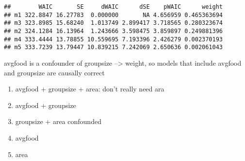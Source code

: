 \documentclass[
]{article}
\begin{document}
\begin{verbatim}
##        WAIC       SE     dWAIC      dSE    pWAIC      weight
## m1 322.8847 16.27783  0.000000       NA 4.656959 0.465363694
## m3 323.8985 15.68240  1.013749 2.899417 3.718565 0.280323674
## m2 324.1284 16.13964  1.243666 3.598475 3.859897 0.249881396
## m4 333.4444 13.78855 10.559695 7.193396 2.426279 0.002370193
## m5 333.7239 13.79447 10.839215 7.242069 2.650636 0.002061043
\end{verbatim}

avgfood is a confounder of groupsize --\textgreater{} weight, so models
that include avgfood and groupsize are causally correct

\begin{enumerate}
\def\labelenumi{(\arabic{enumi})}
\item
  avgfood + groupsize + area: don't really need ara
\item
  avgfood + groupsize
\item
  groupsize + area confounded
\item
  avgfood
\item
  area
\end{enumerate}
\end{document}
